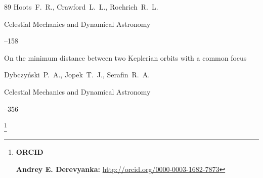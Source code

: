 \begin{thebibliography}{89}
\by Hoots~F.~R., Crawford~L.~L., Roehrich~R.~L.

\jour Celestial Mechanics and Dynamical Astronomy




–158






\paper On the minimum distance between two Keplerian orbits with a common focus

\by Dybczy\'nski~P.~A., Jopek~T.~J., Serafin~R.~A.

\jour Celestial Mechanics and Dynamical Astronomy




--356






\end{thebibliography}





\RuDate	



\makeentitle



\thanks{{\bf ORCID}



{\bf Andrey E. Derevyanka:} \url{http://orcid.org/0000-0003-1682-7873}





}





\EngRef



